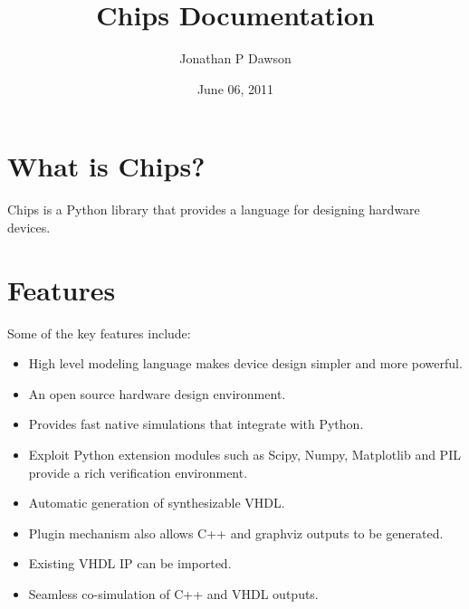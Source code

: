 \documentclass[letterpaper,10pt,english]{sphinxmanual}
\title{Chips Documentation}
\date{June 06, 2011}
\author{Jonathan P Dawson}
\begin{document}
\maketitle
\tableofcontents
{}\label{index::doc}



\chapter{What is Chips?}
\label{index:chips-hardware-design-in-python}\label{index:what-is-chips}
Chips is a Python library that provides a language for designing hardware
devices.


\chapter{Features}
\label{index:features}
Some of the key features include:
\begin{itemize}
\item {} 
High level modeling language makes device design simpler and more
powerful.

\item {} 
An open source hardware design environment.

\item {} 
Provides fast native simulations that integrate with Python.

\item {} 
Exploit Python extension modules such as Scipy, Numpy, Matplotlib and PIL
provide a rich verification environment.

\item {} 
Automatic generation of synthesizable VHDL.

\item {} 
Plugin mechanism also allows C++ and graphviz outputs to be generated.

\item {} 
Existing VHDL IP can be imported.

\item {} 
Seamless co-simulation of C++ and VHDL outputs.

\end{itemize}
\end{document}
